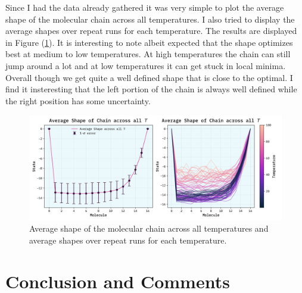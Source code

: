 \documentclass[10pt, titlepage, a4paper]{article}
\begin{document}
Since I had the data already gathered it was very simple to plot the average shape of the molecular chain across all temperatures. I also tried to 
display the average shapes over repeat runs for each temperature. The results are displayed in Figure (\ref{fig:molecular-chain-shapes}). It is 
interesting to note albeit expected that the shape optimizes best at medium to low temperatures. At high temperatures the chain can 
still jump around a lot and at low temperatures it can get stuck in local minima. Overall though we get quite a well defined shape that is close 
to the optimal. I find it insteresting that the left portion of the chain is always well defined while the right position has some uncertainty.

\begin{figure}[H]
    \centering
    \includegraphics[width=.95\textwidth]{../MolecularChain2/Images/rand-init-T-spread.png}
    \caption{Average shape of the molecular chain across all temperatures and average shapes over repeat runs for each temperature.}
    \label{fig:molecular-chain-shapes}
\end{figure}


\section{Conclusion and Comments}




\end{document}

